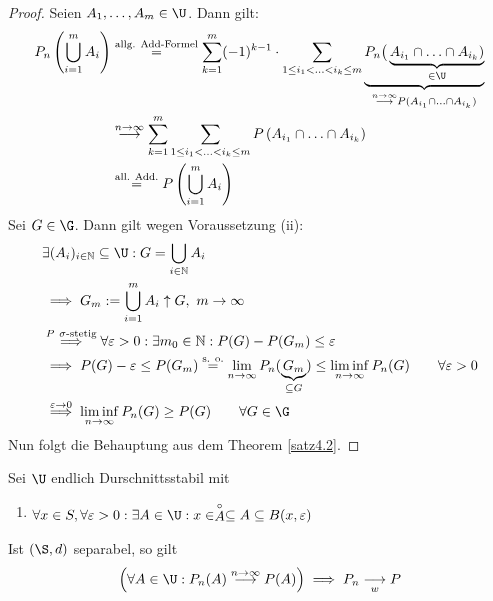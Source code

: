 \begin{proof}
Seien $A_1,\ldots,A_m\in\U$. Dann gilt:
\begin{align*}
P_n\left(\bigcup\limits_{i=1}^m A_i\right)
&\stackeq{\text{allg. Add-Formel}}
\sum\limits_{k=1}^m (-1)^{k-1}\cdot\sum\limits_{1\leq i_1<\ldots<i_k\leq m}\underbrace{P_n\big(\underbrace{A_{i_1}\cap\ldots\cap A_{i_k})}_{\in\U}}_{\stackrel{n\to\infty}{\longrightarrow} P(A_{i_1}\cap\ldots\cap A_{i_k})}\\
&\stackrel{n\to\infty}{\longrightarrow}
\sum\limits_{k=1}^m\sum\limits_{1\leq i_1<\ldots<i_k\leq m} P\left(A_{i_1}\cap\ldots\cap A_{i_k}\right)\\
&\stackeq{\text{all. Add.}}
P\left(\bigcup\limits_{i=1}^m A_i\right)
\end{align*}
Sei $G\in\G$. Dann gilt wegen Voraussetzung (ii):
\begin{align*}
&\exists(A_i)_{i\in\N}\subseteq\U:G=\bigcup\limits_{i\in\N} A_i\\
&\implies
G_m:=\bigcup\limits_{i=1}^m A_i\uparrow G,~m\to\infty\\
&\stackrel{P~\sigma\text{-stetig}}{\implies}
\forall \varepsilon>0:\exists m_0\in\N:P(G)-P(G_m)\leq\varepsilon\\
&\implies
P(G)-\varepsilon\leq P(G_m)
\stackeq{\text{s. o.}}
\limn P_n(\underbrace{G_m}_{\subseteq G})\leq\liminf\limits_{n\to\infty} P_n(G)\qquad\forall\varepsilon>0\\
&\stackrel{\varepsilon\to0}{\implies}
\liminf\limits_{n\to\infty} P_n(G)\geq P(G)\qquad\forall G\in\G
\end{align*}
Nun folgt die Behauptung aus dem Theorem \ref{satz4.2}.
\end{proof}

\begin{korollar}\label{korollar4.4}
Sei $\U$ endlich Durschnittsstabil mit
\begin{enumerate}[label=(\roman*)]
\item $\begin{aligned}
\forall x\in S,\forall\varepsilon>0:\exists A\in\U:x\in\stackrel{\circ}{A}\subseteq A\subseteq B(x,\varepsilon)
\end{aligned}$
\end{enumerate}
Ist $(\S,d)$ separabel, so gilt
\begin{align*}
\Big(\forall A\in\U:P_n(A)\stackrel{n\to\infty}{\longrightarrow} P(A)\Big)
\implies P_n\stackrelnew{w}{}{\longrightarrow} P
\end{align*}
\end{korollar}

